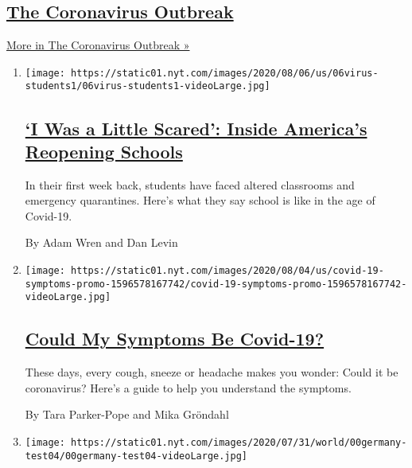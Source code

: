 \hypertarget{the-coronavirus-outbreak}{%
\subsection{\texorpdfstring{\href{/news-event/coronavirus}{The
Coronavirus
Outbreak}}{The Coronavirus Outbreak}}\label{the-coronavirus-outbreak}}

\href{/news-event/coronavirus}{More in The Coronavirus Outbreak »}

\begin{enumerate}
\def\labelenumi{\arabic{enumi}.}
\item
  \texttt{[image: https://static01.nyt.com/images/2020/08/06/us/06virus-students1/06virus-students1-videoLarge.jpg]}

  \hypertarget{i-was-a-little-scared-inside-americas-reopening-schools}{%
  \subsection{\texorpdfstring{\href{/2020/08/06/us/coronavirus-students.html}{`I
  Was a Little Scared': Inside America's Reopening
  Schools}}{`I Was a Little Scared': Inside America's Reopening Schools}}\label{i-was-a-little-scared-inside-americas-reopening-schools}}

  In their first week back, students have faced altered classrooms and
  emergency quarantines. Here's what they say school is like in the age
  of Covid-19.

  By Adam Wren and Dan Levin
\item
  \texttt{[image: https://static01.nyt.com/images/2020/08/04/us/covid-19-symptoms-promo-1596578167742/covid-19-symptoms-promo-1596578167742-videoLarge.jpg]}

  \hypertarget{could-my-symptoms-be-covid-19-1}{%
  \subsection{\texorpdfstring{\href{/interactive/2020/08/05/well/covid-19-symptoms.html}{Could
  My Symptoms Be
  Covid-19?}}{Could My Symptoms Be Covid-19?}}\label{could-my-symptoms-be-covid-19-1}}

  These days, every cough, sneeze or headache makes you wonder: Could it
  be coronavirus? Here's a guide to help you understand the symptoms.

  By Tara Parker-Pope and Mika Gröndahl
\item
  \texttt{[image: https://static01.nyt.com/images/2020/07/31/world/00germany-test04/00germany-test04-videoLarge.jpg]}


\end{enumerate}
